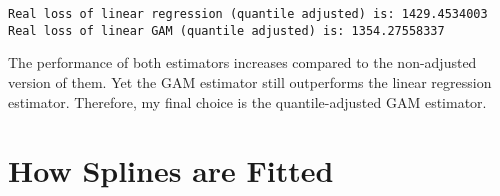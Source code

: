 \documentclass[11pt]{article}
\begin{document}
    \begin{Verbatim}[commandchars=\\\{\}]
Real loss of linear regression (quantile adjusted) is: 1429.4534003
Real loss of linear GAM (quantile adjusted) is: 1354.27558337

    \end{Verbatim}

    The performance of both estimators increases compared to the
non-adjusted version of them. Yet the GAM estimator still outperforms
the linear regression estimator. Therefore, my final choice is the
quantile-adjusted GAM estimator.

    \section{How Splines are Fitted}\label{how-splines-are-fitted}
\end{document}
